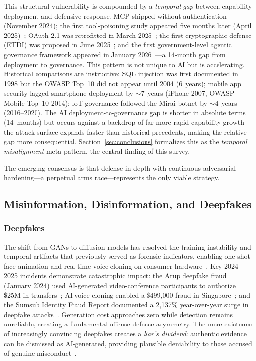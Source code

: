 This structural vulnerability is compounded by a \emph{temporal gap} between capability deployment and defensive response. MCP shipped without authentication (November 2024); the first tool-poisoning study appeared five months later (April 2025)~\cite{invariant2025toolpoisoning}; OAuth 2.1 was retrofitted in March 2025~\cite{mcpspec2025}; the first cryptographic defense (ETDI) was proposed in June 2025~\cite{bhatt2025etdi}; and the first government-level agentic governance framework appeared in January 2026~\cite{imda2026agentic}---a 14-month gap from deployment to governance. This pattern is not unique to AI but is accelerating. Historical comparisons are instructive: SQL injection was first documented in 1998 but the OWASP Top~10 did not appear until 2004 (6~years); mobile app security lagged smartphone deployment by $\sim$7~years (iPhone 2007, OWASP Mobile Top~10 2014); IoT governance followed the Mirai botnet by $\sim$4~years (2016--2020). The AI deployment-to-governance gap is shorter in absolute terms (14~months) but occurs against a backdrop of far more rapid capability growth---the attack surface expands faster than historical precedents, making the relative gap more consequential. Section~\ref{sec:conclusions} formalizes this as the \emph{temporal misalignment} meta-pattern, the central finding of this survey.

The emerging consensus is that defense-in-depth with continuous adversarial hardening---a perpetual arms race---represents the only viable strategy.


\subsection{Misinformation, Disinformation, and Deepfakes}
\label{sec:threat-misinfo}

\subsubsection{Deepfakes}
\label{sec:threat-deepfake}

The shift from GANs to diffusion models has resolved the training instability and temporal artifacts that previously served as forensic indicators, enabling one-shot face animation and real-time voice cloning on consumer hardware~\cite{pei2024deepfakesurvey}. Key 2024--2025 incidents demonstrate catastrophic impact: the Arup deepfake fraud (January 2024) used AI-generated video-conference participants to authorize \$25M in transfers~\cite{wef2025arup}; AI voice cloning enabled a \$499,000 fraud in Singapore~\cite{brightside2025phishing}; and the Sumsub Identity Fraud Report documented a 2,137\% year-over-year surge in deepfake attacks~\cite{sumsub2024}. Generation cost approaches zero while detection remains unreliable, creating a fundamental offense-defense asymmetry. The mere existence of increasingly convincing deepfakes creates a \emph{liar's dividend}: authentic evidence can be dismissed as AI-generated, providing plausible deniability to those accused of genuine misconduct~\cite{chesney2019deepfakes}.



